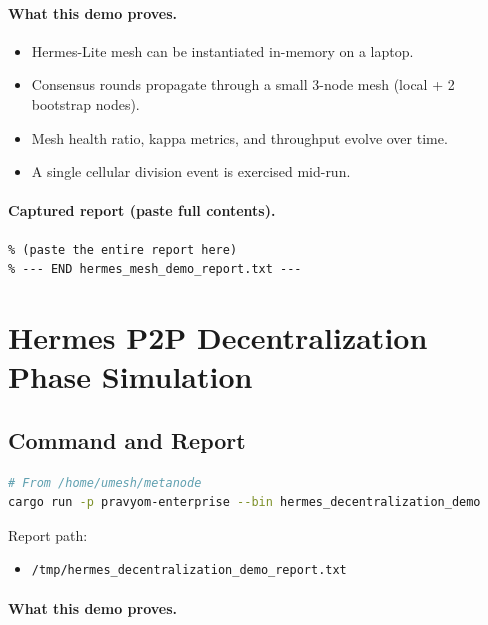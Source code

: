 \paragraph{What this demo proves.}

\begin{itemize}
  \item Hermes-Lite mesh can be instantiated in-memory on a laptop.
  \item Consensus rounds propagate through a small 3-node mesh (local + 2 bootstrap nodes).
  \item Mesh health ratio, kappa metrics, and throughput evolve over time.
  \item A single cellular division event is exercised mid-run.
\end{itemize}

\paragraph{Captured report (paste full contents).}

\begin{lstlisting}[language=text]
% --- BEGIN hermes_mesh_demo_report.txt ---
% (paste the entire report here)
% --- END hermes_mesh_demo_report.txt ---
\end{lstlisting}

\section{Hermes P2P Decentralization Phase Simulation}

\subsection{Command and Report}

\begin{lstlisting}[language=bash]
# From /home/umesh/metanode
cargo run -p pravyom-enterprise --bin hermes_decentralization_demo
\end{lstlisting}

Report path:

\begin{itemize}
  \item \texttt{/tmp/hermes_decentralization_demo_report.txt}
\end{itemize}

\paragraph{What this demo proves.}

